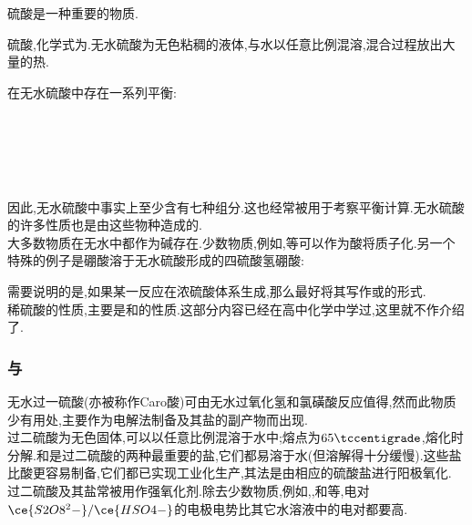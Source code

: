 \documentclass{ctexart}
\begin{document}
\subsubsection{}
硫酸是一种重要的物质.
\begin{substance}[\ce{H2SO4}]
    硫酸,化学式为.无水硫酸为无色粘稠的液体,与水以任意比例混溶,混合过程放出大量的热.
\end{substance}
在无水硫酸中存在一系列平衡:
\begin{center}
    \\
    \\
    \\
    \\
\end{center}
因此,无水硫酸中事实上至少含有七种组分.这也经常被用于考察平衡计算.无水硫酸的许多性质也是由这些物种造成的.\\
\indent 大多数物质在无水中都作为碱存在.少数物质,例如,等可以作为酸将质子化.另一个特殊的例子是硼酸溶于无水硫酸形成的四硫酸氢硼酸:
\begin{center}
\end{center}
\indent 需要说明的是,如果某一反应在浓硫酸体系生成,那么最好将其写作或的形式.\\
\indent 稀硫酸的性质,主要是和的性质.这部分内容已经在高中化学中学过,这里就不作介绍了.
\subsubsection{与}
无水过一硫酸(亦被称作Caro酸)可由无水过氧化氢和氯磺酸反应值得,然而此物质少有用处,主要作为电解法制备及其盐的副产物而出现.\\
\indent 过二硫酸为无色固体,可以以任意比例混溶于水中;熔点为$65\tccentigrade$,熔化时分解.和是过二硫酸的两种最重要的盐,它们都易溶于水(但溶解得十分缓慢).这些盐比酸更容易制备,它们都已实现工业化生产,其法是由相应的硫酸盐进行阳极氧化.\\
\indent 过二硫酸及其盐常被用作强氧化剂.除去少数物质,例如,,和等,电对$\ce{S2O8^2-}/\ce{HSO4-}$的电极电势比其它水溶液中的电对都要高.
\end{document}
